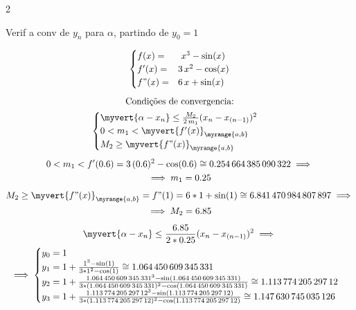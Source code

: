 \documentclass[./CN_A-Tests_Resolutions.tex]{subfiles}
\begin{document}
\begin{questionBox}2{} %

  Verif a conv de \(y_n\) para \(\alpha\), partindo de \(y_0=1\)

  \answer{}

  \begin{gather*}
    \begin{cases}
      f (x)=& \,\,x^3-\sin(x)
      \\ f'(x)=& 3\,x^2-\cos(x)
      \\ f"(x)=& 6\,x+\sin(x)
    \end{cases}
    \\[1ex]
    \text{Condições de convergencia:}\\
    \begin{cases}
      \myvert{\alpha-x_n}
      \leq
      \frac{M_2}{2\,m_1}
      (x_n-x_{(n-1)})^2
      \\
      0<m_1<\myvert{f'(x)}_{\myrange{a,b}}
      \\
      M_2\geq \myvert{f"(x)}_{\myrange{a,b}}
    \end{cases}
    \\[1ex]
    0<m_1<
    f'(0.6)
    = 3\,(0.6)^2-\cos(0.6)
    \cong\num{0.254664385090322}
    \implies \\
    \implies
    m_1=0.25
    \\[1ex]
    M_2\geq 
    \myvert{f"(x)}_{\myrange{a,b}}
    =f"(1)
    =6*1+\sin(1)
    \cong\num{6.841470984807897}
    \implies \\
    \implies
    M_2=6.85
    \\[1ex]
    \myvert{\alpha-x_n}
    \leq \frac{6.85}{2*0.25}
    (x_n-x_{(n-1)})^2
    \implies \\
    \implies
    \begin{cases}
      y_0=1
      \\
      y_1
      =1+\frac{1^3-\sin(1)}{3*1^2-\cos(1)}
      \cong\num{1.064450609345331}
      \\
      y_2
      =1+\frac{
        \num{1.064450609345331}^3
        -\sin(\num{1.064450609345331})
      }{
        3*(\num{1.064450609345331})^2
        -\cos(\num{1.064450609345331})
      }
      \cong\num{1.11377420529712}
      \\
      y_3
      =1+\frac{
        \num{1.11377420529712}^3
        -\sin(\num{1.11377420529712})
      }{
        3*(\num{1.11377420529712})^2
        -\cos(\num{1.11377420529712})
      }
      \cong\num{1.147630745035126}
    \end{cases}

\end{gather*}
\end{questionBox}
\end{document}
